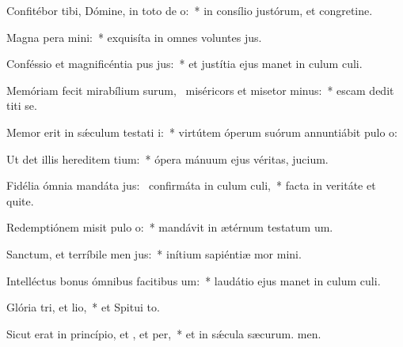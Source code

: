 \item Confitébor tibi, Dómine, in toto de o:~* in consílio justórum, et congretine.
\item Magna pera mini:~* exquisíta in omnes voluntes jus.
\item Conféssio et magnificéntia pus jus:~* et justítia ejus manet in culum culi.
\item Memóriam fecit mirabílium surum,~\pscross{} miséricors et misetor minus:~* escam dedit titi se.
\item Memor erit in sǽculum testati i:~* virtútem óperum suórum annuntiábit pulo o:
\item Ut det illis hereditem tium:~* ópera mánuum ejus véritas,  jucium.
\item Fidélia ómnia mandáta jus:~\pscross{} confirmáta in culum culi,~* facta in veritáte et quite.
\item Redemptiónem misit pulo o:~* mandávit in ætérnum testatum um.
\item Sanctum, et terríbile men jus:~* inítium sapiéntiæ mor mini.
\item Intelléctus bonus ómnibus facitibus um:~* laudátio ejus manet in culum culi.
\item Glória tri, et lio,~* et Spitui to.
\item Sicut erat in princípio, et , et per,~* et in sǽcula sæcurum. men.
